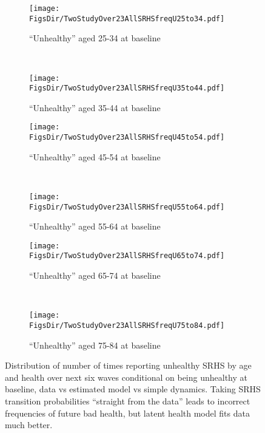 \documentclass[12pt,pdftex,letterpaper]{article}
\newcommand{\RootDir}{..}
\newcommand{\FigsDir}{\RootDir/Figures}
\begin{document}
\begin{figure}
	\centering
	\begin{subfigure}[b]{0.48\textwidth}
		\texttt{[image: \\FigsDir/TwoStudyOver23AllSRHSfreqU25to34.pdf]}
		\caption{``Unhealthy'' aged 25-34 at baseline}\label{fig:SRHSfreqU25to34}
	\end{subfigure}
	~
	\begin{subfigure}[b]{0.48\textwidth}
		\texttt{[image: \\FigsDir/TwoStudyOver23AllSRHSfreqU35to44.pdf]}
		\caption{``Unhealthy'' aged 35-44 at baseline}\label{fig:SRHSfreqU35to44}
	\end{subfigure}
	
	\begin{subfigure}[b]{0.48\textwidth}
		\texttt{[image: \\FigsDir/TwoStudyOver23AllSRHSfreqU45to54.pdf]}
		\caption{``Unhealthy'' aged 45-54 at baseline}\label{fig:SRHSfreqU45to54}
	\end{subfigure}
	~
	\begin{subfigure}[b]{0.48\textwidth}
		\texttt{[image: \\FigsDir/TwoStudyOver23AllSRHSfreqU55to64.pdf]}
		\caption{``Unhealthy'' aged 55-64 at baseline}\label{fig:SRHSfreqU55to64}
	\end{subfigure}
	
	
	\begin{subfigure}[b]{0.48\textwidth}
		\texttt{[image: \\FigsDir/TwoStudyOver23AllSRHSfreqU65to74.pdf]}
		\caption{``Unhealthy'' aged 65-74 at baseline}\label{fig:SRHSfreqU65to74}
	\end{subfigure}
	~
	\begin{subfigure}[b]{0.48\textwidth}
		\texttt{[image: \\FigsDir/TwoStudyOver23AllSRHSfreqU75to84.pdf]}
		\caption{``Unhealthy'' aged 75-84 at baseline}\label{fig:SRHSfreqU75to84}
	\end{subfigure}
	\caption{Distribution of number of times reporting unhealthy SRHS by age and health over next six waves conditional on being unhealthy at baseline, data vs estimated model vs simple dynamics. Taking SRHS transition probabilities ``straight from the data'' leads to incorrect frequencies of future bad health, but latent health model fits data much better. }\label{fig:SRHSfreqUTwoStudy}
\end{figure}
\end{document}

